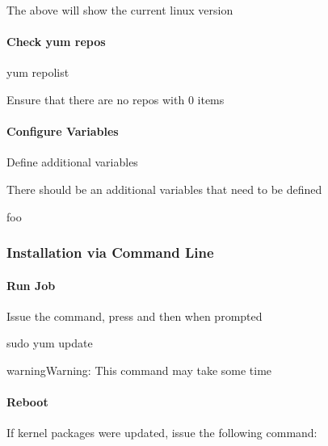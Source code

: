 \documentclass[letterpaper,10pt,english]{sphinxmanual}
\begin{document}
\sphinxAtStartPar
The above will show the current linux version


\paragraph{Check yum repos}
\label{\detokenize{install:check-yum-repos}}
\begin{sphinxVerbatim}[commandchars=\\\{\}]
yum repolist
\end{sphinxVerbatim}

\sphinxAtStartPar
Ensure that there are no repos with 0 items


\paragraph{Configure Variables}
\label{\detokenize{install:configure-variables}}
\sphinxAtStartPar
Define additional variables

\sphinxAtStartPar
There should be an additional variables that need to be defined

\begin{sphinxVerbatim}[commandchars=\\\{\}]
 foo
\end{sphinxVerbatim}


\subsubsection{Installation via Command Line}
\label{\detokenize{install:installation-via-command-line}}

\paragraph{Run Job}
\label{\detokenize{install:run-job}}
\sphinxAtStartPar
Issue the command, press  and then \sphinxcode{\sphinxupquote{{[}ENTER{]}}} when prompted

\begin{sphinxVerbatim}[commandchars=\\\{\}]
sudo yum update
\end{sphinxVerbatim}

\begin{sphinxadmonition}{warning}{Warning:}
\sphinxAtStartPar
This command may take some time
\end{sphinxadmonition}


\paragraph{Reboot}
\label{\detokenize{install:reboot}}
\sphinxAtStartPar
If kernel packages were updated, issue the following command:
\end{document}
